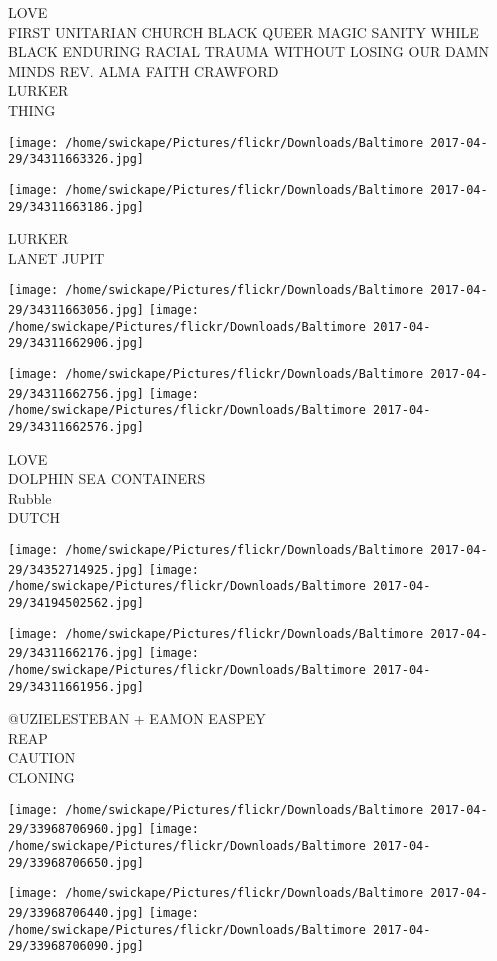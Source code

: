 \documentclass[10pt,letterpaper]{article}
\begin{document}
LOVE\\
FIRST UNITARIAN CHURCH BLACK QUEER MAGIC SANITY WHILE BLACK ENDURING RACIAL TRAUMA WITHOUT LOSING OUR DAMN MINDS REV. ALMA FAITH CRAWFORD\\
LURKER\\
THING
\pagebreak

\texttt{[image: /home/swickape/Pictures/flickr/Downloads/Baltimore 2017-04-29/34311663326.jpg]}

\vspace{0.25in}
\texttt{[image: /home/swickape/Pictures/flickr/Downloads/Baltimore 2017-04-29/34311663186.jpg]}

LURKER\\
LANET JUPIT
\pagebreak

\texttt{[image: /home/swickape/Pictures/flickr/Downloads/Baltimore 2017-04-29/34311663056.jpg]}
\texttt{[image: /home/swickape/Pictures/flickr/Downloads/Baltimore 2017-04-29/34311662906.jpg]}

\texttt{[image: /home/swickape/Pictures/flickr/Downloads/Baltimore 2017-04-29/34311662756.jpg]}
\texttt{[image: /home/swickape/Pictures/flickr/Downloads/Baltimore 2017-04-29/34311662576.jpg]}

LOVE\\
DOLPHIN SEA CONTAINERS\\
Rubble\\
DUTCH
\pagebreak

\texttt{[image: /home/swickape/Pictures/flickr/Downloads/Baltimore 2017-04-29/34352714925.jpg]}
\texttt{[image: /home/swickape/Pictures/flickr/Downloads/Baltimore 2017-04-29/34194502562.jpg]}

\texttt{[image: /home/swickape/Pictures/flickr/Downloads/Baltimore 2017-04-29/34311662176.jpg]}
\texttt{[image: /home/swickape/Pictures/flickr/Downloads/Baltimore 2017-04-29/34311661956.jpg]}

@UZIELESTEBAN + EAMON EASPEY\\
REAP\\
CAUTION\\
CLONING
\pagebreak

\texttt{[image: /home/swickape/Pictures/flickr/Downloads/Baltimore 2017-04-29/33968706960.jpg]}
\texttt{[image: /home/swickape/Pictures/flickr/Downloads/Baltimore 2017-04-29/33968706650.jpg]}

\texttt{[image: /home/swickape/Pictures/flickr/Downloads/Baltimore 2017-04-29/33968706440.jpg]}
\texttt{[image: /home/swickape/Pictures/flickr/Downloads/Baltimore 2017-04-29/33968706090.jpg]}
\end{document}
